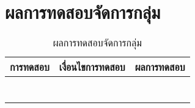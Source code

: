 \section{ผลการทดสอบจัดการกลุ่ม}
\begin{table}[H]
	\caption{ผลการทดสอบจัดการกลุ่ม}
    \centering	
	\label{tab:test17}
    \begin{tabular}{ | p{4cm} | p{4cm} | p{4cm} |  }
		\hline
	\multicolumn{1}{|c|}{การทดสอบ} & \multicolumn{1}{c|}{เงื่อนไขการทดสอบ} & \multicolumn{1}{c|}{ผลการทดสอบ}   \\ \hline
	\setstretch{1.0}{ทดสอบจัดการกลุ่ม}
	& \setstretch{1.0}{เจ้าของกลุ่มคลิกเลือกเพิ่มสมาชิกกลุ่ม}
	& \setstretch{1.0}{ระบบจะเพิ่มสมาชิกเข้ามาในกลุ่ม} \\ \cline{2-3} 
	& \setstretch{1.0}{เจ้าของกลุ่มเลือกลบสมาชิกกลุ่ม}
	& \setstretch{1.0}{ระบบจะลบสมาชิกเข้ามาในกลุ่ม } \\ \cline{2-3} 
	& \setstretch{1.0}{เจ้าของกลุ่มเลือกข้อมูลกลุ่ม}
	& \setstretch{1.0}{ระบบจะแสดงแยกระหว่างเจ้าของกลุ่ม และสมาชิกในกลุ่ม } \\ \cline{2-3} 
	& \setstretch{1.0}{เจ้าของกลุ่มเลือกลบกลุ่ม}
	& \setstretch{1.0}{ระบบลบสมาชิกทุกคนในกลุ่ม และลบกลุ่ม จากนั้นจะกลับไปหน้าแสดงกลุ่ม } \\ \cline{2-3} 
	& \setstretch{1.0}{สมาชิกในกลุ่มเลือกออกจากกลุ่ม}
	& \setstretch{1.0}{ระบบจะลบสมาชิกออกจากกลุ่ม } \\ \cline{2-3} 
	& \setstretch{1.0}{ผู้ใช้กรอกข้อความและกดส่งข้อความ}
	& \setstretch{1.0}{ระบบจะบันทึกข้อความและแสดงข้อความ } \\ \cline{2-3} 
	& \setstretch{1.0}{ผู้ใช้ไม่กรอกข้อความและกดส่งข้อความ}
	& \setstretch{1.0}{ระบบจะไม่บันทึกข้อความ และไม่แสดงข้อความ } \\ \hline
    \end{tabular}
\end{table}

